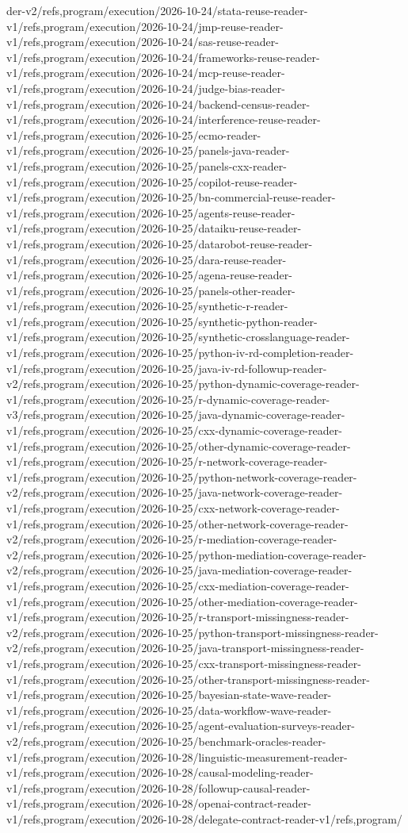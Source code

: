 \documentclass[11pt,a4paper,openany]{book}
\begin{document}
der-v2/refs,program/execution/2026-10-24/stata-reuse-reader-v1/refs,program/execution/2026-10-24/jmp-reuse-reader-v1/refs,program/execution/2026-10-24/sas-reuse-reader-v1/refs,program/execution/2026-10-24/frameworks-reuse-reader-v1/refs,program/execution/2026-10-24/mcp-reuse-reader-v1/refs,program/execution/2026-10-24/judge-bias-reader-v1/refs,program/execution/2026-10-24/backend-census-reader-v1/refs,program/execution/2026-10-24/interference-reuse-reader-v1/refs,program/execution/2026-10-25/ecmo-reader-v1/refs,program/execution/2026-10-25/panels-java-reader-v1/refs,program/execution/2026-10-25/panels-cxx-reader-v1/refs,program/execution/2026-10-25/copilot-reuse-reader-v1/refs,program/execution/2026-10-25/bn-commercial-reuse-reader-v1/refs,program/execution/2026-10-25/agents-reuse-reader-v1/refs,program/execution/2026-10-25/dataiku-reuse-reader-v1/refs,program/execution/2026-10-25/datarobot-reuse-reader-v1/refs,program/execution/2026-10-25/dara-reuse-reader-v1/refs,program/execution/2026-10-25/agena-reuse-reader-v1/refs,program/execution/2026-10-25/panels-other-reader-v1/refs,program/execution/2026-10-25/synthetic-r-reader-v1/refs,program/execution/2026-10-25/synthetic-python-reader-v1/refs,program/execution/2026-10-25/synthetic-crosslanguage-reader-v1/refs,program/execution/2026-10-25/python-iv-rd-completion-reader-v1/refs,program/execution/2026-10-25/java-iv-rd-followup-reader-v2/refs,program/execution/2026-10-25/python-dynamic-coverage-reader-v1/refs,program/execution/2026-10-25/r-dynamic-coverage-reader-v3/refs,program/execution/2026-10-25/java-dynamic-coverage-reader-v1/refs,program/execution/2026-10-25/cxx-dynamic-coverage-reader-v1/refs,program/execution/2026-10-25/other-dynamic-coverage-reader-v1/refs,program/execution/2026-10-25/r-network-coverage-reader-v1/refs,program/execution/2026-10-25/python-network-coverage-reader-v2/refs,program/execution/2026-10-25/java-network-coverage-reader-v1/refs,program/execution/2026-10-25/cxx-network-coverage-reader-v1/refs,program/execution/2026-10-25/other-network-coverage-reader-v2/refs,program/execution/2026-10-25/r-mediation-coverage-reader-v2/refs,program/execution/2026-10-25/python-mediation-coverage-reader-v2/refs,program/execution/2026-10-25/java-mediation-coverage-reader-v1/refs,program/execution/2026-10-25/cxx-mediation-coverage-reader-v1/refs,program/execution/2026-10-25/other-mediation-coverage-reader-v1/refs,program/execution/2026-10-25/r-transport-missingness-reader-v2/refs,program/execution/2026-10-25/python-transport-missingness-reader-v2/refs,program/execution/2026-10-25/java-transport-missingness-reader-v1/refs,program/execution/2026-10-25/cxx-transport-missingness-reader-v1/refs,program/execution/2026-10-25/other-transport-missingness-reader-v1/refs,program/execution/2026-10-25/bayesian-state-wave-reader-v1/refs,program/execution/2026-10-25/data-workflow-wave-reader-v1/refs,program/execution/2026-10-25/agent-evaluation-surveys-reader-v2/refs,program/execution/2026-10-25/benchmark-oracles-reader-v1/refs,program/execution/2026-10-28/linguistic-measurement-reader-v1/refs,program/execution/2026-10-28/causal-modeling-reader-v1/refs,program/execution/2026-10-28/followup-causal-reader-v1/refs,program/execution/2026-10-28/openai-contract-reader-v1/refs,program/execution/2026-10-28/delegate-contract-reader-v1/refs,program/
\end{document}
